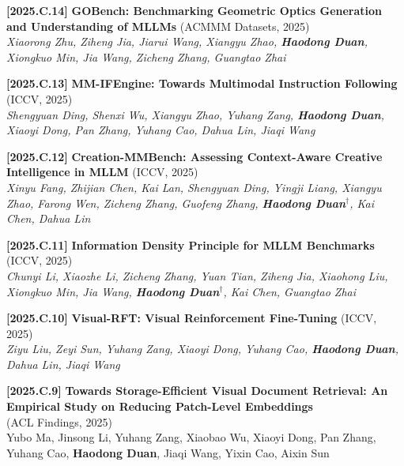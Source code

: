 \documentclass{resume}
\newcommand{\itemgap}{\vspace{-1mm}}%
\begin{document}
\itemgap

\textbf{[2025.C.14]} \textbf{GOBench: Benchmarking Geometric Optics Generation and Understanding of MLLMs} (ACMMM Datasets, 2025) \\
\textit{Xiaorong Zhu, Ziheng Jia, Jiarui Wang, Xiangyu Zhao, \textbf{Haodong Duan}, Xiongkuo Min, Jia Wang, Zicheng Zhang, Guangtao Zhai} \\

\itemgap

\textbf{[2025.C.13]} \textbf{MM-IFEngine: Towards Multimodal Instruction Following} (ICCV, 2025) \\
\textit{Shengyuan Ding, Shenxi Wu, Xiangyu Zhao, Yuhang Zang, \textbf{Haodong Duan}, Xiaoyi Dong, Pan Zhang, Yuhang Cao, Dahua Lin, Jiaqi Wang} \\ 

\itemgap

\textbf{[2025.C.12]} \textbf{Creation-MMBench: Assessing Context-Aware Creative Intelligence in MLLM} (ICCV, 2025) \\
\textit{Xinyu Fang, Zhijian Chen, Kai Lan, Shengyuan Ding, Yingji Liang, Xiangyu Zhao, Farong Wen, Zicheng Zhang, Guofeng Zhang, \textbf{Haodong Duan$^\dag$}, Kai Chen, Dahua Lin} \\

\itemgap

\textbf{[2025.C.11]} \textbf{Information Density Principle for MLLM Benchmarks} (ICCV, 2025) \\
\textit{Chunyi Li, Xiaozhe Li, Zicheng Zhang, Yuan Tian, Ziheng Jia, Xiaohong Liu, Xiongkuo Min, Jia Wang, \textbf{Haodong Duan$^\dag$}, Kai Chen, Guangtao Zhai} \\

\itemgap

\textbf{[2025.C.10]} \textbf{Visual-RFT: Visual Reinforcement Fine-Tuning}  (ICCV, 2025) \\
\textit{Ziyu Liu, Zeyi Sun, Yuhang Zang, Xiaoyi Dong, Yuhang Cao, \textbf{Haodong Duan}, Dahua Lin, Jiaqi Wang} \\

\itemgap

\textbf{[2025.C.9]} \textbf{Towards Storage-Efficient Visual Document Retrieval: An Empirical Study on Reducing Patch-Level Embeddings} \\ 
(ACL Findings, 2025) \\
Yubo Ma, Jinsong Li, Yuhang Zang, Xiaobao Wu, Xiaoyi Dong, Pan Zhang, Yuhang Cao, \textbf{Haodong Duan}, Jiaqi Wang, Yixin Cao, Aixin Sun \\
\end{document}
